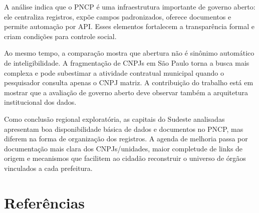 \documentclass[12pt]{article}
\begin{document}
A análise indica que o PNCP é uma infraestrutura importante de governo
aberto: ele centraliza registros, expõe campos padronizados, oferece
documentos e permite automação por API. Esses elementos fortalecem a
transparência formal e criam condições para controle social.

Ao mesmo tempo, a comparação mostra que abertura não é sinônimo
automático de inteligibilidade. A fragmentação de CNPJs em São Paulo
torna a busca mais complexa e pode subestimar a atividade contratual
municipal quando o pesquisador consulta apenas o CNPJ matriz. A
contribuição do trabalho está em mostrar que a avaliação de governo
aberto deve observar também a arquitetura institucional dos dados.

Como conclusão regional exploratória, as capitais do Sudeste analisadas
apresentam boa disponibilidade básica de dados e documentos no PNCP, mas
diferem na forma de organização dos registros. A agenda de melhoria
passa por documentação mais clara dos CNPJs/unidades, maior completude
de links de origem e mecanismos que facilitem ao cidadão reconstruir o
universo de órgãos vinculados a cada prefeitura.

\section{Referências}\label{referuxeancias}
\end{document}
